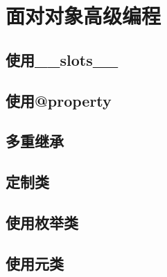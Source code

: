 \newpage
\section{面对对象高级编程}
\subsection{使用\_\_slots\_\_}
\subsection{使用@property}
\subsection{多重继承}
\subsection{定制类}
\subsection{使用枚举类}
\subsection{使用元类}